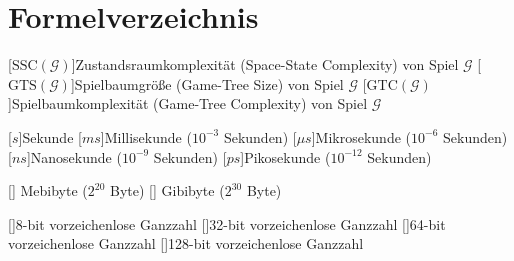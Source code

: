 \chapter*{Formelverzeichnis}

\DeclareSIUnit{}

\newcommand{\acrounit}[1]{
    \acroextra{\makebox[13mm][l]{\si[per-mode=fraction,fraction-function=\sfrac]{#1}}}
}
\def\acrospace{\acroextra{\makebox[14.375mm][l]{}}}


\begin{acronym}[WYSISWG] %


    [\ensuremath{\text{SSC}(\mathcal{G})}]{Zustandsraumkomplexität (Space-State Complexity) von Spiel $\mathcal{G}$}
    [\ensuremath{\text{GTS}(\mathcal{G})}]{Spielbaumgröße (Game-Tree Size) von Spiel $\mathcal{G}$}
    [\ensuremath{\text{GTC}(\mathcal{G})}]{Spielbaumkomplexität (Game-Tree Complexity) von Spiel $\mathcal{G}$}

    \vspace{1.2cm}

    [\ensuremath{s}]{Sekunde}
    [\ensuremath{ms}]{Millisekunde ($10^{-3}$ Sekunden)}
    [\ensuremath{\mu{}s}]{Mikrosekunde ($10^{-6}$ Sekunden)}
    [\ensuremath{ns}]{Nanosekunde ($10^{-9}$ Sekunden)}
    [\ensuremath{ps}]{Pikosekunde ($10^{-12}$ Sekunden)}

    \vspace{1.2cm}

    [\phantom{MiB}]{\acrounit{MiB}Mebibyte ($2^{20}$ Byte)}
    [\phantom{GiB}]{\acrounit{GiB}Gibibyte ($2^{30}$ Byte)}

    \vspace{1.2cm}

    []{8-bit vorzeichenlose Ganzzahl}
    []{32-bit vorzeichenlose Ganzzahl}
    []{64-bit vorzeichenlose Ganzzahl}
    []{128-bit vorzeichenlose Ganzzahl}


\end{acronym}
